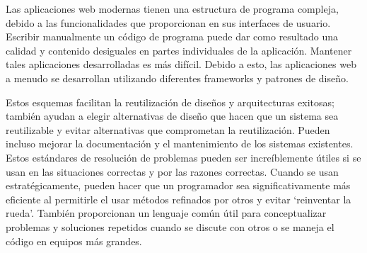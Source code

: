 Las aplicaciones web modernas tienen una estructura de programa compleja, debido a las funcionalidades que proporcionan en sus interfaces de usuario. Escribir manualmente un código de programa puede dar como resultado una calidad y contenido desiguales en partes individuales de la aplicación. Mantener tales aplicaciones desarrolladas es más difícil. Debido a esto, las aplicaciones web a menudo se desarrollan utilizando diferentes \glspl{framework} y patrones de diseño.
\vspace{0.8cm}

Estos esquemas facilitan la reutilización de diseños y arquitecturas exitosas; también ayudan a elegir alternativas de diseño que hacen que un sistema sea reutilizable y evitar alternativas que comprometan la reutilización. Pueden incluso mejorar la documentación y el mantenimiento de los sistemas existentes.
\vspace{0.8cm}
Estos estándares de resolución de problemas pueden ser increíblemente útiles si se usan en las situaciones correctas y por las razones correctas. Cuando se usan estratégicamente, pueden hacer que un programador sea significativamente más eficiente al permitirle el usar métodos refinados por otros y evitar `reinventar la rueda'. También proporcionan un lenguaje común útil para conceptualizar problemas y soluciones repetidos cuando se discute con otros o se maneja el código en equipos más grandes.